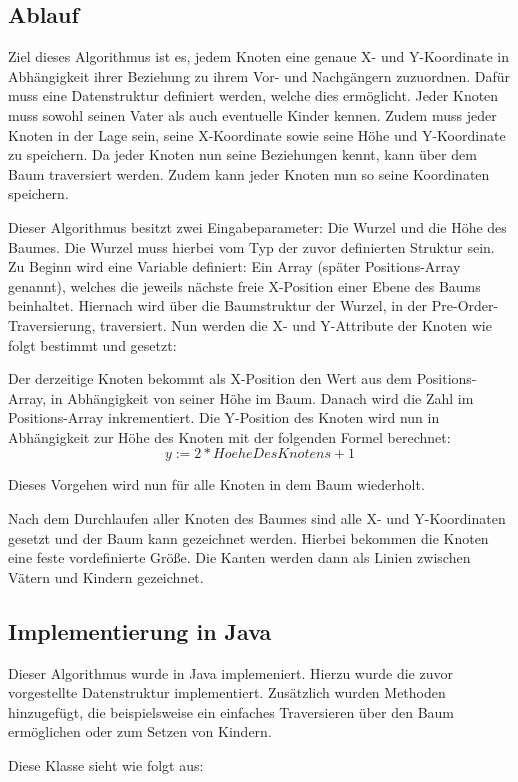 \label{chap:kapitel3_1_Ablauf}
\subsection{Ablauf}
Ziel dieses Algorithmus ist es, jedem Knoten eine genaue X- und Y-Koordinate in Abhängigkeit ihrer Beziehung zu ihrem Vor- und Nachgängern
zuzuordnen. Dafür muss eine Datenstruktur definiert werden, welche dies ermöglicht. Jeder Knoten muss sowohl seinen Vater als auch eventuelle
Kinder kennen. Zudem muss jeder Knoten in der Lage sein, seine X-Koordinate sowie seine Höhe und Y-Koordinate zu speichern. Da jeder Knoten
nun seine Beziehungen kennt, kann über dem Baum traversiert werden. Zudem kann jeder Knoten nun so seine Koordinaten speichern.

Dieser Algorithmus besitzt zwei Eingabeparameter: Die Wurzel und die Höhe des Baumes.
Die Wurzel muss hierbei vom Typ der zuvor definierten Struktur sein. Zu Beginn wird eine Variable definiert:
Ein Array (später Positions-Array genannt), welches die jeweils nächste freie X-Position einer Ebene des Baums beinhaltet.
Hiernach wird über die Baumstruktur der Wurzel, in der Pre-Order-Traversierung, traversiert.
Nun werden die X- und Y-Attribute der Knoten wie folgt bestimmt und gesetzt:

Der derzeitige Knoten bekommt als X-Position den Wert aus dem Positions-Array, in Abhängigkeit von seiner Höhe im Baum.
Danach wird die Zahl im Positions-Array inkrementiert. Die Y-Position des Knoten wird nun in Abhängigkeit zur Höhe des Knoten
mit der folgenden Formel berechnet: $$y := 2 * HoeheDesKnotens + 1$$

Dieses Vorgehen wird nun für alle Knoten in dem Baum wiederholt. 

Nach dem Durchlaufen aller Knoten des Baumes sind alle X- und Y-Koordinaten gesetzt und der Baum kann gezeichnet werden.
Hierbei bekommen die Knoten eine feste vordefinierte Größe. Die Kanten werden dann als Linien zwischen Vätern und Kindern 
gezeichnet.

\subsection{Implementierung in Java}
Dieser Algorithmus wurde in Java implemeniert. Hierzu wurde die zuvor vorgestellte Datenstruktur
implementiert. Zusätzlich wurden Methoden hinzugefügt, die beispielsweise
ein einfaches Traversieren über den Baum ermöglichen oder zum Setzen von Kindern.

Diese Klasse sieht wie folgt aus:

